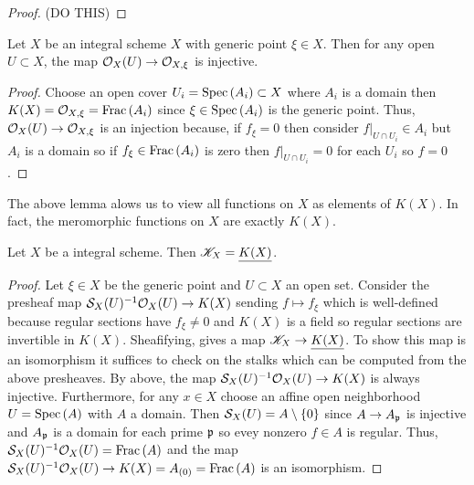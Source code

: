\documentclass[12pt]{article}
\begin{document}
\begin{proof}
(DO THIS)
\end{proof}



\begin{lemma}
Let $X$ be an integral scheme $X$ with generic point $\xi \in X$. Then for any open $U \subset X$, the map $\struct{X}(U) \to \stalk{X}{\xi}$ is injective.
\end{lemma}

\begin{proof}
Choose an open cover $U_i = \Spec{A_i} \subset X$ where $A_i$ is a domain then $K(X) = \stalk{X}{\xi} = \Frac{A_i}$ since $\xi \in \Spec{A_i}$ is the generic point. Thus, $\struct{X}(U) \to \stalk{X}{\xi}$ is an injection because, if $f_\xi = 0$ then consider $f|_{U \cap U_i} \in A_i$ but $A_i$ is a domain so if $f_\xi \in \Frac{A_i}$ is zero then $f|_{U \cap U_i} = 0$ for each $U_i$ so $f = 0$. 
\end{proof}

\begin{rmk}
The above lemma alows us to view all functions on $X$ as elements of $K(X)$. In fact, the meromorphic functions on $X$ are exactly $K(X)$. 
\end{rmk}

\begin{prop}
Let $X$ be a integral scheme. Then $\K_X = \underline{K(X)}$.
\end{prop}

\begin{proof}
Let $\xi \in X$ be the generic point and $U \subset X$ an open set. Consider the  presheaf map $\S_X(U)^{-1} \struct{X}(U) \to K(X)$ sending $f \mapsto f_\xi$ which is well-defined because regular sections have $f_\xi \neq 0$ and $K(X)$ is a field so regular sections are invertible in $K(X)$. Sheafifying, gives a map $\K_X \to \underline{K(X)}$. To show this map is an isomorphism it suffices to check on the stalks which can be computed from the above presheaves. By above, the map $\S_X(U)^{-1} \struct{X}(U) \to K(X)$ is always injective. Furthermore, for any $x \in X$ choose an affine open neighborhood $U = \Spec{A}$ with $A$ a domain. Then $\S_X(U) = A \setminus \{ 0 \}$ since $A \to A_\p$ is injective and $A_\p$ is a domain for each prime $\p$ so evey nonzero $f \in A$ is regular. Thus, $\S_X(U)^{-1} \struct{X}(U) = \Frac{A}$ and the map $\S_X(U)^{-1} \struct{X}(U) \to K(X) = A_{(0)} = \Frac{A}$ is an isomorphism.   
\end{proof}
\end{document}
